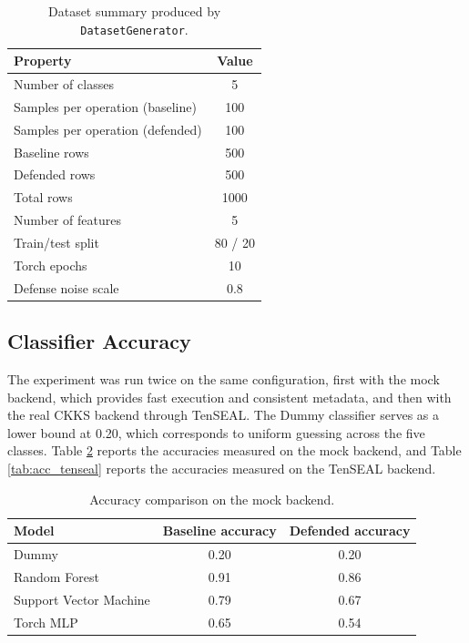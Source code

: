 \documentclass[12pt,a4paper]{article}
\begin{document}
\begin{table}[h]
\centering
\caption{Dataset summary produced by \texttt{DatasetGenerator}.}
\label{tab:dataset}
\begin{tabular}{lc}
\toprule
\textbf{Property} & \textbf{Value} \\
\midrule
Number of classes                 & 5 \\
Samples per operation (baseline)  & 100 \\
Samples per operation (defended)  & 100 \\
Baseline rows                     & 500 \\
Defended rows                     & 500 \\
Total rows                        & 1000 \\
Number of features                & 5 \\
Train/test split                  & 80 / 20 \\
Torch epochs                      & 10 \\
Defense noise scale               & 0.8 \\
\bottomrule
\end{tabular}
\end{table}

\subsection{Classifier Accuracy}
The experiment was run twice on the same configuration, first with the mock backend, which provides fast execution and consistent metadata, and then with the real CKKS backend through TenSEAL. The Dummy classifier serves as a lower bound at 0.20, which corresponds to uniform guessing across the five classes. Table \ref{tab:acc_mock} reports the accuracies measured on the mock backend, and Table \ref{tab:acc_tenseal} reports the accuracies measured on the TenSEAL backend.

\begin{table}[h]
\centering
\caption{Accuracy comparison on the mock backend.}
\label{tab:acc_mock}
\begin{tabular}{lcc}
\toprule
\textbf{Model} & \textbf{Baseline accuracy} & \textbf{Defended accuracy} \\
\midrule
Dummy                   & 0.20 & 0.20 \\
Random Forest           & 0.91 & 0.86 \\
Support Vector Machine  & 0.79 & 0.67 \\
Torch MLP               & 0.65 & 0.54 \\
\bottomrule
\end{tabular}
\end{table}
\end{document}
